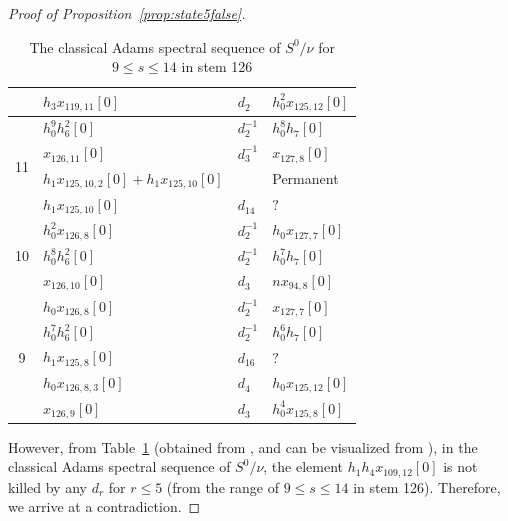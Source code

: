 \begin{proof}[Proof of Proposition~\ref{prop:state5false}]
\begin{table}[h]
{\begin{tabular}{|c|l|l|l|}
 & $h_3x_{119,11}[0]$ & $d_{2}$ & $h_0^2x_{125,12}[0]$ \\\hline\hline
\multirow{4}{*}{11} & $h_0^9h_6^2[0]$ & $d_{2}^{-1}$ & $h_0^8h_7[0]$ \\\cline{2-4}
 & $x_{126,11}[0]$ & $d_{3}^{-1}$ & $x_{127,8}[0]$ \\\cline{2-4}
 & $h_1x_{125,10,2}[0]+h_1x_{125,10}[0]$ & & Permanent \\\cline{2-4}
 & $h_1x_{125,10}[0]$ & $d_{14}$ & $?$ \\\hline\hline
\multirow{3}{*}{10} & $h_0^2x_{126,8}[0]$ & $d_{2}^{-1}$ & $h_0x_{127,7}[0]$ \\\cline{2-4}
 & $h_0^8h_6^2[0]$ & $d_{2}^{-1}$ & $h_0^7h_7[0]$ \\\cline{2-4}
 & $x_{126,10}[0]$ & $d_{3}$ & $nx_{94,8}[0]$ \\\hline\hline
\multirow{5}{*}{9} & $h_0x_{126,8}[0]$ & $d_{2}^{-1}$ & $x_{127,7}[0]$ \\\cline{2-4}
 & $h_0^7h_6^2[0]$ & $d_{2}^{-1}$ & $h_0^6h_7[0]$ \\\cline{2-4}
 & $h_1x_{125,8}[0]$ & $d_{16}$ & $?$ \\\cline{2-4}
 & $h_0x_{126,8,3}[0]$ & $d_{4}$ & $h_0x_{125,12}[0]$ \\\cline{2-4}
 & $x_{126,9}[0]$ & $d_{3}$ & $h_0^4x_{125,8}[0]$ \\\hline %
\end{tabular}}
\caption{The classical Adams spectral sequence of $S^0/\nu$ for $9 \le s \le 14$ in stem 126}
\label{Table:Cnu126}
\end{table}


However, from Table~\ref{Table:Cnu126} (obtained from \cite{LWXMachine} \cite{LWXZenodo}, and can be visualized from \cite{LinPlot}), in the classical Adams spectral sequence of $S^0/\nu$, the element  $h_1h_4x_{109,12}[0]$ is not killed by any $d_r$ for $r \leq 5$ (from the range of $9 \le s \le 14$ in stem 126). Therefore, we arrive at a contradiction.
\end{proof}



